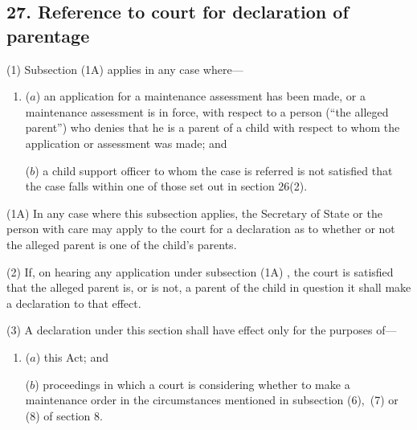 \documentclass[12pt,a4paper]{article}
\begin{document}

\subsection{27. Reference to court for declaration of parentage}

%
%

(1) Subsection (1A) applies in any case where—
\begin{enumerate}\item[]
($a$) an application for a maintenance assessment has been made, or a maintenance assessment is in force, with respect to a person (“the alleged parent”) who denies that he is a parent of a child with respect to whom the application or assessment was made; and

($b$) a child support officer to whom the case is referred is not satisfied that the case falls within one of those set out in section 26(2).
\end{enumerate}

(1A) In any case where this subsection applies, the Secretary of State or the person with care may apply to the court for a declaration as to whether or not the alleged parent is one of the child’s parents.

(2) If, on hearing any application under subsection 
(1A)%
, the court is satisfied that the alleged parent is, or is not, a parent of the child in question it shall make a declaration to that effect.


(3) A declaration under this section shall have effect only for the purposes of—
\begin{enumerate}\item[]
($a$) this Act; and

($b$) proceedings in which a court is considering whether to make a maintenance order in the circumstances mentioned in subsection (6),~(7) or (8) of section 8.
\end{enumerate}
\end{document}

